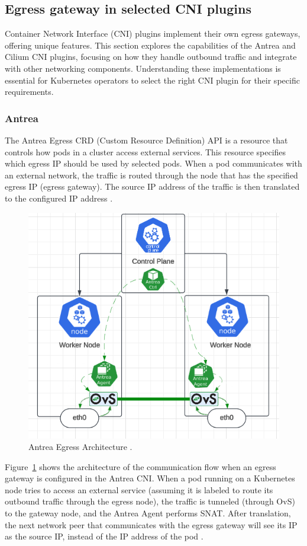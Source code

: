 \subsection{Egress gateway in selected CNI plugins}
\label{subsection:egressGateway}

Container Network Interface (CNI) plugins implement their own egress gateways, offering unique features. This section explores the capabilities of the Antrea and Cilium CNI plugins, focusing on how they handle outbound traffic and integrate with other networking components. Understanding these implementations is essential for Kubernetes operators to select the right CNI plugin for their specific requirements.


\subsubsection{Antrea}
\label{subsection:antreaEgress}

The Antrea Egress CRD (Custom Resource Definition) API is a resource that controls how pods in a cluster access external services. This resource specifies which egress IP should be used by selected pods. When a pod communicates with an external network, the traffic is routed through the node that has the specified egress IP (egress gateway). The source IP address of the traffic is then translated to the configured IP address \cite{AntreaEgressArch}.

\begin{figure}[tbh]
    \centering
    \includegraphics[width=0.6\columnwidth]{images/antrea_overview.png}
    \caption{Antrea Egress Architecture \cite{LucidApp}\cite{AntreaEgressArch}.}
    \label{fig:antreaEgressArch}
\end{figure}


Figure~\ref{fig:antreaEgressArch} shows the architecture of the communication flow when an egress gateway is configured in the Antrea CNI. When a pod running on a Kubernetes node tries to access an external service (assuming it is labeled to route its outbound traffic through the egress node), the traffic is tunneled (through OvS) to the gateway node, and the Antrea Agent performs SNAT. After translation, the next network peer that communicates with the egress gateway will see its IP as the source IP, instead of the IP address of the pod \cite{AntreaEgressArch} \cite{AntreaSNAT} \cite{AntreaArch}.

